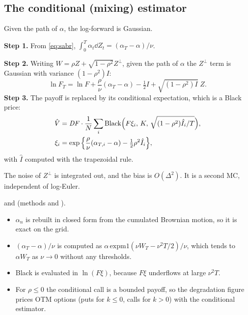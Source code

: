 \subsection{The conditional (mixing) estimator}
Given the path of $\alpha$, the log-forward is Gaussian.

\noindent\textbf{Step 1.} From \eqref{eq:sabr}, $\int_0^T\alpha_t\dd Z_t=(\alpha_T-\alpha)/\nu$.

\noindent\textbf{Step 2.} Writing $W=\rho Z+\sqrt{1-\rho^2}Z^\perp$, given the path of $\alpha$ the $Z^\perp$ term is
Gaussian with variance $(1-\rho^2)I$:
\begin{equation}\label{eq:sabr-mixing}
\ln F_T=\ln F+\frac\rho\nu(\alpha_T-\alpha)-\tfrac12I+\sqrt{(1-\rho^2)I}\;Z .
\end{equation}
\noindent\textbf{Step 3.} The payoff is replaced by its conditional expectation, which is a Black price:
\begin{equation}\label{eq:sabr-mixing-stima}
\begin{aligned}
\hat V&=\mathit{DF}\cdot\frac1N\sum_i\mathrm{Black}\Big(F\xi_i,\,K,\,\sqrt{(1-\rho^2)\hat I_i/T}\Big),\\
\xi_i&=\exp\Big\{\frac\rho\nu(\alpha_{T,i}-\alpha)-\tfrac12\rho^2\hat I_i\Big\},
\end{aligned}
\end{equation}
with $\hat I$ computed with the trapezoidal rule.

The noise of $Z^\perp$ is integrated out, and the bias is $O(\Delta^2)$. It is a second MC, independent of
log-Euler.

\begin{progetto}[title={In the qpricer project: numerical details of the MC}]
 and  (methods  and ).
\begin{itemize}
\item $\alpha_n$ is rebuilt in closed form from the cumulated Brownian motion, so it is exact on the grid.
\item $(\alpha_T-\alpha)/\nu$ is computed as $\alpha\,\mathrm{expm1}(\nu W_T-\nu^2T/2)/\nu$, which tends to
$\alpha W_T$ as $\nu\to0$ without any thresholds.
\item Black is evaluated in $\ln(F\xi)$, because $F\xi$ underflows at large $\nu^2T$.
\item For $\rho\le0$ the conditional call is a bounded payoff, so the degradation figure prices OTM options (puts for
$k\le0$, calls for $k>0$) with the conditional estimator.
\end{itemize}
\end{progetto}

